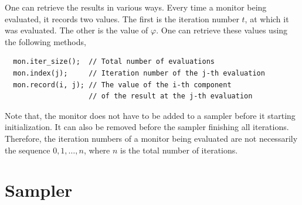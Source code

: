 One can retrieve the results in various ways. Every time a monitor being
evaluated, it records two values. The first is the iteration number $t$, at
which it was evaluated. The other is the value of $\varphi$. One can retrieve
these values using the following methods,
\begin{Verbatim}
  mon.iter_size();  // Total number of evaluations
  mon.index(j);     // Iteration number of the j-th evaluation
  mon.record(i, j); // The value of the i-th component
                    // of the result at the j-th evaluation
\end{Verbatim}
Note that, the monitor does not have to be added to a sampler before it
starting initialization. It can also be removed before the sampler finishing
all iterations. Therefore, the iteration numbers of a monitor being evaluated
are not necessarily the sequence $0,1,\dots,n$, where $n$ is the total number
of iterations.

\section{Sampler}
\label{sec:Sampler}

